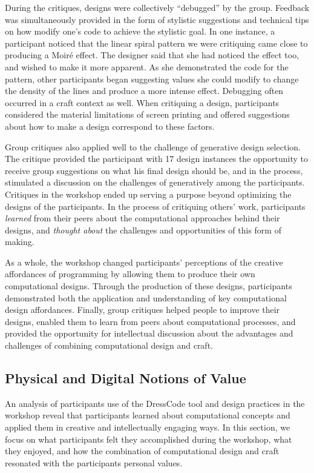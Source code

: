 \documentclass{sigchi}
\begin{document}
During the critiques, designs were collectively ``debugged'' by the group. Feedback was simultaneously provided in the form of stylistic suggestions and technical tips on how modify one's code to achieve the stylistic goal. In one instance, a participant noticed that the linear spiral pattern we were critiquing came close to producing a Moiré effect. The designer said that she had noticed the effect too, and wished to make it more apparent. As she demonstrated the code for the pattern, other participants began suggesting values she could modify to change the density of the lines and produce a more intense effect. Debugging often occurred in a craft context as well. When critiquing a design, participants considered the material limitations of screen printing and offered suggestions about how to make a design correspond to these factors.

Group critiques also applied well to the challenge of generative design selection. The critique provided the participant with 17 design instances the opportunity to receive group suggestions on what his final design should be, and in the process, stimulated a discussion on the challenges of generatively among the participants. Critiques in the workshop ended up serving a purpose beyond optimizing the designs of the participants. In the process of critiquing others' work, participants \emph{learned} from their peers about the computational approaches behind their designs, and \emph{thought about} the challenges and opportunities of this form of making.

As a whole, the workshop changed participants' perceptions of the creative affordances of programming by allowing them to produce their own computational designs. Through the production of these designs, participants demonstrated both the application and understanding of key computational design affordances. Finally, group critiques helped people to improve their designs, enabled them to learn from peers about computational processes, and provided the opportunity for intellectual discussion about the advantages and challenges of combining computational design and craft.

\subsection{Physical and Digital Notions of Value}
An analysis of participants use of the DressCode tool and design practices in the workshop reveal that participants learned about computational concepts and applied them in creative and intellectually engaging ways. In this section, we focus on what participants felt they accomplished during the workshop, what they enjoyed, and how the combination of computational design and craft resonated with the participants personal values. 
\end{document}
